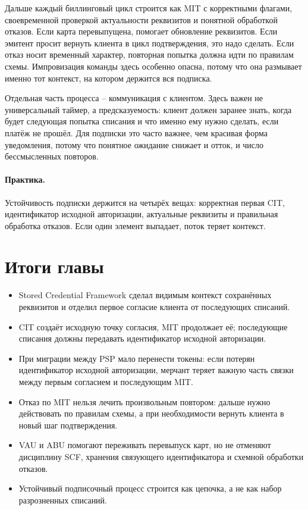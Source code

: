 Дальше каждый биллинговый цикл строится как MIT с корректными флагами,
своевременной проверкой актуальности реквизитов и понятной обработкой
отказов. Если карта перевыпущена, помогает обновление реквизитов. Если
эмитент просит вернуть клиента в цикл подтверждения, это надо сделать.
Если отказ носит временный характер, повторная попытка должна идти по
правилам схемы. Импровизация команды здесь особенно опасна, потому что
она размывает именно тот контекст, на котором держится вся подписка.

Отдельная часть процесса -- коммуникация с клиентом. Здесь важен не
универсальный таймер, а предсказуемость: клиент должен заранее знать,
когда будет следующая попытка списания и что именно ему нужно сделать,
если платёж не прошёл. Для подписки это часто важнее, чем красивая
форма уведомления, потому что понятное ожидание снижает и отток, и
число бессмысленных повторов.

\paragraph{Практика.}
Устойчивость подписки держится на четырёх вещах: корректная первая CIT, идентификатор исходной авторизации, актуальные реквизиты и правильная обработка отказов. Если один элемент выпадает, поток теряет контекст.


\section*{Итоги главы}
\begin{itemize}
  \item Stored Credential Framework сделал видимым контекст сохранённых
        реквизитов и отделил первое согласие клиента от последующих списаний.
  \item CIT создаёт исходную точку согласия, MIT продолжает её;
        последующие списания должны передавать идентификатор исходной
        авторизации.
  \item При миграции между PSP мало перенести токены: если потерян
        идентификатор исходной авторизации, мерчант теряет важную часть
        связки между первым согласием и последующим MIT.
  \item Отказ по MIT нельзя лечить произвольным повтором: дальше нужно
        действовать по правилам схемы, а при необходимости вернуть
        клиента в новый шаг подтверждения.
  \item VAU и ABU помогают переживать перевыпуск карт, но не отменяют
        дисциплину SCF, хранения связующего идентификатора и схемной
        обработки отказов.
  \item Устойчивый подписочный процесс строится как цепочка, а не как
        набор разрозненных списаний.
\end{itemize}
